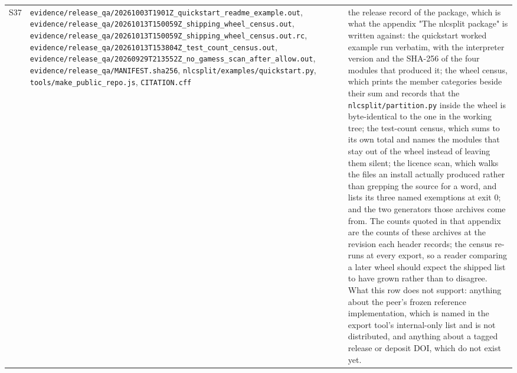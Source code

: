 \documentclass[11pt]{article}
\begin{document}
\begin{longtable}{c>{\raggedright\arraybackslash}p{}>{\raggedright\arraybackslash}p{}}
S37 & \texttt{evidence/\allowbreak{}release\_\allowbreak{}qa/\allowbreak{}20261003T1901Z\_\allowbreak{}quickstart\_\allowbreak{}readme\_\allowbreak{}example.out}, \texttt{evidence/\allowbreak{}release\_\allowbreak{}qa/\allowbreak{}20261013T150059Z\_\allowbreak{}shipping\_\allowbreak{}wheel\_\allowbreak{}census.out}, \texttt{evidence/\allowbreak{}release\_\allowbreak{}qa/\allowbreak{}20261013T150059Z\_\allowbreak{}shipping\_\allowbreak{}wheel\_\allowbreak{}census.out.rc}, \texttt{evidence/\allowbreak{}release\_\allowbreak{}qa/\allowbreak{}20261013T153804Z\_\allowbreak{}test\_\allowbreak{}count\_\allowbreak{}census.out}, \texttt{evidence/\allowbreak{}release\_\allowbreak{}qa/\allowbreak{}20260929T213552Z\_\allowbreak{}no\_\allowbreak{}gamess\_\allowbreak{}scan\_\allowbreak{}after\_\allowbreak{}allow.out}, \texttt{evidence/\allowbreak{}release\_\allowbreak{}qa/\allowbreak{}MANIFEST.sha256}, \texttt{nlcsplit/\allowbreak{}examples/\allowbreak{}quickstart.py}, \texttt{tools/make\_public\_repo.js}, \texttt{CITATION.cff} & the release record of the package, which is what the appendix "The nlcsplit package" is written against: the quickstart worked example run verbatim, with the interpreter version and the SHA-256 of the four modules that produced it; the wheel census, which prints the member categories beside their sum and records that the \texttt{nlcsplit/partition.py} inside the wheel is byte-identical to the one in the working tree; the test-count census, which sums to its own total and names the modules that stay out of the wheel instead of leaving them silent; the licence scan, which walks the files an install actually produced rather than grepping the source for a word, and lists its three named exemptions at exit 0; and the two generators those archives come from. The counts quoted in that appendix are the counts of these archives at the revision each header records; the census re-runs at every export, so a reader comparing a later wheel should expect the shipped list to have grown rather than to disagree. What this row does not support: anything about the peer's frozen reference implementation, which is named in the export tool's internal-only list and is not distributed, and anything about a tagged release or deposit DOI, which do not exist yet. \\
\end{longtable}
\normalsize
\end{document}
